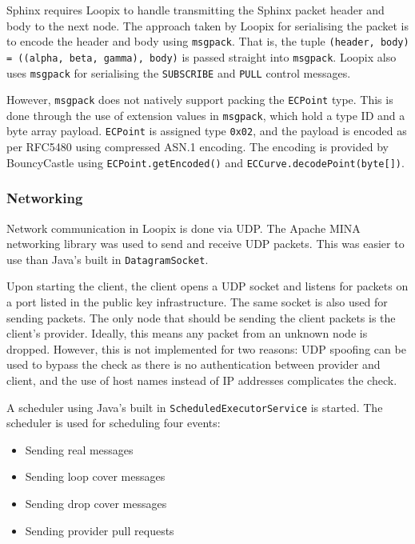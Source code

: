 \documentclass[final,dissertation.tex]{subfiles}
\begin{document}
Sphinx requires Loopix to handle transmitting the Sphinx packet header and body to the next node. The approach taken by Loopix for serialising the packet is to encode the header and body using \verb|msgpack|. That is, the tuple \verb|(header, body) = ((alpha, beta, gamma), body)| is passed straight into \verb|msgpack|. Loopix also uses \verb|msgpack| for serialising the \verb|SUBSCRIBE| and \verb|PULL| control messages.

However, \verb|msgpack| does not natively support packing the \verb|ECPoint| type. This is done through the use of extension values in \verb|msgpack|, which hold a type ID and a byte array payload. \verb|ECPoint| is assigned type \verb|0x02|, and the payload is encoded as per RFC5480 \cite{RFC5480} using compressed ASN.1 encoding. The encoding is provided by BouncyCastle using \verb|ECPoint.getEncoded()| and \verb|ECCurve.decodePoint(byte[])|.

\subsubsection{Networking}

Network communication in Loopix is done via UDP. The Apache MINA networking library was used to send and receive UDP packets. This was easier to use than Java's built in \verb|DatagramSocket|. 

Upon starting the client, the client opens a UDP socket and listens for packets on a port listed in the public key infrastructure. The same socket is also used for sending packets. The only node that should be sending the client packets is the client's provider. Ideally, this means any packet from an unknown node is dropped. However, this is not implemented for two reasons: UDP spoofing can be used to bypass the check as there is no authentication between provider and client, and the use of host names instead of IP addresses complicates the check.

A scheduler using Java's built in \verb|ScheduledExecutorService| is started. The scheduler is used for scheduling four events:

\begin{itemize}
	\item Sending real messages
	\item Sending loop cover messages
	\item Sending drop cover messages
	\item Sending provider pull requests
\end{itemize}
\end{document}

